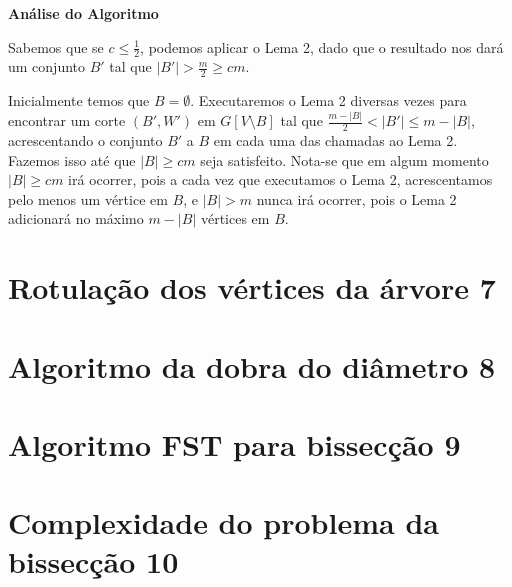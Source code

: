 \documentclass[a4paper,12pt]{article}
\begin{document}
\bigskip
\bigskip

\textbf{Análise do Algoritmo}

	Sabemos que se $c \le \frac{1}{2}$, podemos aplicar o Lema 2, 
	dado que o resultado nos dará um conjunto $B'$ tal que
	$|B'|>\frac{m}{2}\ge cm$.

	Inicialmente temos que $B = \emptyset$.
	Executaremos o Lema 2 diversas vezes para encontrar 
	um corte $(B',W')$ em $G[V\setminus B]$ tal que $\frac{m-|B|}{2}<|B'|\le m-|B|$,
	acrescentando o conjunto $B'$ a $B$ em cada uma das chamadas ao Lema 2.
	Fazemos isso até que $|B|\ge cm$ seja satisfeito.
	Nota-se que em algum momento $|B|\ge cm$ irá ocorrer, pois a cada vez
	que executamos o Lema 2, acrescentamos pelo menos um vértice em $B$,
	e $|B|>m$ nunca irá ocorrer, pois o Lema 2 adicionará no máximo 
	$m-|B|$ vértices em $B$.

\newpage

\section {Rotulação dos vértices da árvore 7}


\section {Algoritmo da dobra do diâmetro 8}


\section {Algoritmo FST para bissecção 9}



\section {Complexidade do problema da bissecção 10}
\end{document}
